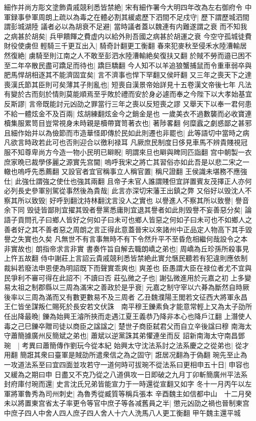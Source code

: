 細作并尚方彫文塗飾貴戚競利悉皆禁絶|{
	宋有細作署今大明四年改為左右御府令}
中軍録事參軍周朗上疏以為毒之在體必割其緩處歷下泗間不足戍守|{
	歷下謂歷城泗間謂彭城湖陸}
議者必以為胡衰不足避|{
	當時議者蓋以魏連有内難遂謂之衰}
而不知我之病甚於胡矣|{
	兵甲饋餫之費虚内以給外則吾國之病甚於胡運之衰}
今空守孤城徒費財役使虜但輕騎三千更互出入|{
	騎奇計翻更工衡翻}
春來犯麥秋至侵禾水陸漕輸居然復絶|{
	虜騎至則江南之人不敢至彭泗水陸漕輸絶矣復扶又翻}
於賊不勞而邉已困不至二年卒散民盡可蹻足而待也|{
	蹻巨驕翻}
今人知不以羊追狼蟹捕鼠而令重車弱卒與肥馬悍胡相逐其不能濟固宜矣|{
	言不濟事也悍下罕翻又侯旰翻}
又三年之喪天下之達喪漢氏節其臣則可矣薄其子則亂也|{
	短喪自漢景帝始詳見十五卷漢文帝後七年}
凡法有變於古而刻於情則莫能順焉至乎敗於禮而安於身必遽而奉之今陛下以大孝始基宜反斯謬|{
	言帝既能討元凶劭之罪當行三年之喪以反短喪之謬}
又舉天下以奉一君何患不給一體炫金不及百兩|{
	炫胡練翻炫金今之銷金是也}
一歲美衣不過數襲而必收寶連櫝集服累笥目豈常視身未時親是櫝帶寶笥著衣也|{
	著陟畧翻}
何糜蠧之劇惑鄙之甚邪且細作始并以為儉節而市造華怪即傳於民如此則遷也非罷也|{
	此等語切中當時之病凡欲言時政若此可也否則迎合以徼利禄耳}
凡厥庶民制度日侈見車馬不辨貴賤視冠服不知尊卑尚方今造一物小民明已䁹睨|{
	明謂來旦也䁹與睥同匹詣翻}
宫中朝製一衣庶家晩已裁學侈麗之源實先宫閫|{
	嗚呼我宋之將亡其習俗亦如此吾是以悲二宋之一轍也嗚呼先悉薦翻}
又設官者宜官稱事立人稱官置|{
	稱尺證翻}
王侯識未堪務不應強仕|{
	此強仕謂強之使仕也強其兩翻}
且帝子未官人誰謂賤但宜詳置賓友茂擇正人亦何必列長史參軍别駕從事然後為貴哉|{
	此言亦深切宋藩王出鎮之弊}
又俗好以毁沈人不察其所以致毁|{
	好呼到翻沈持林翻沈言没人之實也}
以譽進人不察其所以致譽|{
	譽音余下同}
毁徒皆鄙則宜擢其毁者譽黨悉庸則宜退其譽者如此則毁譽不妄善惡分矣|{
	論語子貢問孔子曰鄉人皆好之何如子曰未可也鄉人皆惡之何如子曰未可也不如鄉人之善者好之其不善者惡之周朗之言正得此意蓋晉宋以來諸州中正品定人物高下其手毀譽之失實也久矣}
凡無世不有言事無時不有下令然升平不至昏危相繼何哉設令之本非實故也|{
	朗指帝求言非實}
書奏忤旨自解去職朗嶠之弟也|{
	周嶠為丘珍孫所殺事見上忤五故翻}
侍中謝莊上言詔云貴戚競利悉皆禁絶此實允愜民聽若有犯違則應依制裁糾若廢法申恩便為明詔既下而聲實乖爽也|{
	爽差也}
臣愚謂大臣在禄位者尤不宜與民爭利不審可得在此詔不|{
	不讀曰否}
莊弘微之子也|{
	謝弘微進用於元嘉之初}
上多變易太祖之制郡縣以三周為滿宋之善政於是乎衰|{
	元嘉之制守宰以六朞為斷然自時厥後率以三周為滿而又有數更數易不及三周者}
乙丑魏濮陽王閭若文征西大將軍永昌王仁皆坐謀叛仁賜死於長安若文伏誅　南平穆王鑠素負才能意常輕上又為太子劭所任出降最晩|{
	鑠為始興王濬所挾而走遇江夏王義恭乃降非本心也降戶江翻}
上潛使人毒之己巳鑠卒贈司徒以商臣之諡諡之|{
	楚世子商臣弑君父而自立辛後諡曰穆}
南海太守蕭簡據廣州反簡斌之弟也|{
	蕭斌以逆黨誅其弟懼連坐而反}
詔新南海太守南昌鄧琬　|{
	考異曰蕭簡傳作劉玩今從本紀}
始興太守沈法系討之法系慶之之從弟也|{
	從才用翻}
簡誑其衆曰臺軍是賊劭所遣衆信之為之固守|{
	誑居况翻為于偽翻}
琬先至止為一攻道法系至曰宜四面並攻若守一道何時可拔琬不從法系曰更相申五十日|{
	申容也又緩為之期曰申}
日盡又不克乃從之八道俱攻一日即破之九月丁卯斬簡廣州平法系封府庫付琬而還|{
	史言沈氏兄弟皆能宣力于一時還從宣翻又如字}
冬十一月丙午以左軍將軍魯秀為司州刺史|{
	為魯秀從臧質等稱兵張本}
辛酉魏主如信都中山　十二月癸未以將置東宫省太子率更令等官中庶子等各减舊員之半|{
	懲元凶劭之禍也晉制東宫中庶子四人中舍人四人庶子四人舍人十六人洗馬八人更工衡翻}
甲午魏主還平城

